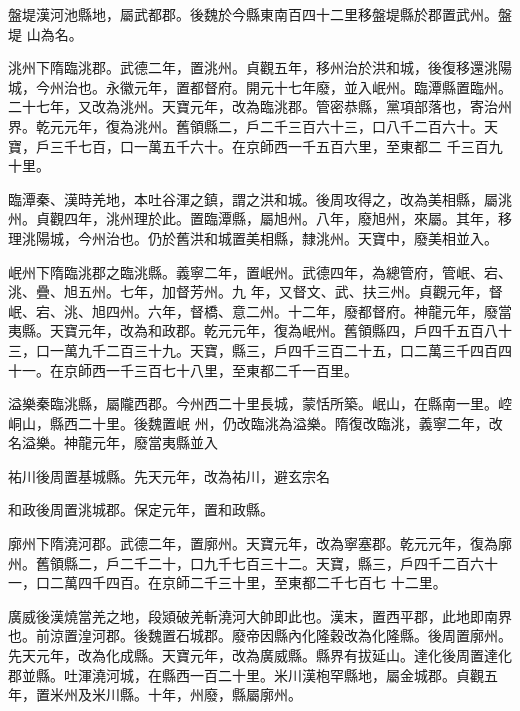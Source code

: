 \begin{pinyinscope}
 盤堤漢河池縣地，屬武都郡。後魏於今縣東南百四十二里移盤堤縣於郡置武州。盤堤
 山為名。



 洮州下隋臨洮郡。武德二年，置洮州。貞觀五年，移州治於洪和城，後復移還洮陽城，今州治也。永徽元年，置都督府。開元十七年廢，並入岷州。臨潭縣置臨州。二十七年，又改為洮州。天寶元年，改為臨洮郡。管密恭縣，黨項部落也，寄治州界。乾元元年，復為洮州。舊領縣二，戶二千三百六十三，口八千二百六十。天寶，戶三千七百，口一萬五千六十。在京師西一千五百六里，至東都二
 千三百九十里。



 臨潭秦、漢時羌地，本吐谷渾之鎮，謂之洪和城。後周攻得之，改為美相縣，屬洮州。貞觀四年，洮州理於此。置臨潭縣，屬旭州。八年，廢旭州，來屬。其年，移理洮陽城，今州治也。仍於舊洪和城置美相縣，隸洮州。天寶中，廢美相並入。



 岷州下隋臨洮郡之臨洮縣。義寧二年，置岷州。武德四年，為總管府，管岷、宕、洮、疊、旭五州。七年，加督芳州。九
 年，又督文、武、扶三州。貞觀元年，督岷、宕、洮、旭四州。六年，督橋、意二州。十二年，廢都督府。神龍元年，廢當夷縣。天寶元年，改為和政郡。乾元元年，復為岷州。舊領縣四，戶四千五百八十三，口一萬九千二百三十九。天寶，縣三，戶四千三百二十五，口二萬三千四百四十一。在京師西一千三百七十八里，至東都二千一百里。



 溢樂秦臨洮縣，屬隴西郡。今州西二十里長城，蒙恬所築。岷山，在縣南一里。崆峒山，縣西二十里。後魏置岷
 州，仍改臨洮為溢樂。隋復改臨洮，義寧二年，改名溢樂。神龍元年，廢當夷縣並入



 祐川後周置基城縣。先天元年，改為祐川，避玄宗名



 和政後周置洮城郡。保定元年，置和政縣。



 廓州下隋澆河郡。武德二年，置廓州。天寶元年，改為寧塞郡。乾元元年，復為廓州。舊領縣二，戶二千二十，口九千七百三十二。天寶，縣三，戶四千二百六十一，口二萬四千四百。在京師二千三十里，至東都二千七百七
 十二里。



 廣威後漢燒當羌之地，段熲破羌斬澆河大帥即此也。漢末，置西平郡，此地即南界也。前涼置湟河郡。後魏置石城郡。廢帝因縣內化隆穀改為化隆縣。後周置廓州。先天元年，改為化成縣。天寶元年，改為廣威縣。縣界有拔延山。達化後周置達化郡並縣。吐渾澆河城，在縣西一百二十里。米川漢枹罕縣地，屬金城郡。貞觀五年，置米州及米川縣。十年，州廢，縣屬廓州。




\end{pinyinscope}
